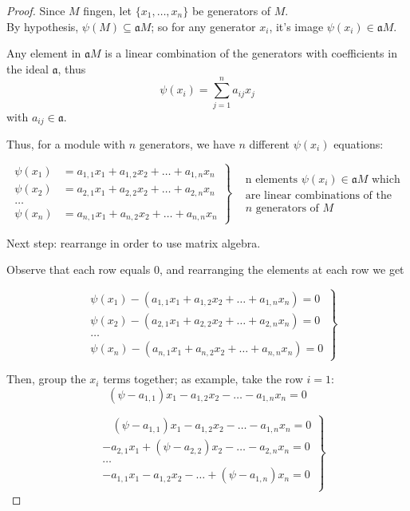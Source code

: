 \documentclass{article}
\theoremstyle{definition}
\newcommand{\aA}{\mathfrak{a}} %
\begin{document}
\begin{proof}
  Since $M$ fingen, let $\{ x_1, \ldots, x_n \}$ be generators of $M$.\\
  By hypothesis, $\psi(M) \subseteq \aA M$; so for any generator $x_i$, it's image $\psi(x_i) \in \aA M$.

  Any element in $\aA M$ is a linear combination of the generators with coefficients in the ideal $\aA$, thus
  $$\psi(x_i)= \sum_{j=1}^n a_{ij} x_j$$
  with $a_{ij} \in \aA$.
  
  Thus, for a module with $n$ generators, we have $n$ different $\psi(x_i)$ equations:

  $$
  \left.
  \begin{aligned}
    \psi(x_1) &= a_{1,1} x_1 + a_{1,2} x_2 + \ldots + a_{1,n} x_n\\
    \psi(x_2) &= a_{2,1} x_1 + a_{2,2} x_2 + \ldots + a_{2,n} x_n\\
    \ldots\\
    \psi(x_n) &= a_{n,1} x_1 + a_{n,2} x_2 + \ldots + a_{n,n} x_n
  \end{aligned}
  \right\}
  \begin{aligned}
      &\text{n elements $\psi(x_i) \in \aA M$ which}\\
      &\text{are linear combinations of the}\\
      &\text{$n$ generators of $M$}
  \end{aligned}
  $$
  
  Next step: rearrange in order to use matrix algebra.

  Observe that each row equals $0$, and rearranging the elements at each row we get

  $$
  \left.
  \begin{aligned}
    &\psi(x_1) - (a_{1,1} x_1 + a_{1,2} x_2 + \ldots + a_{1,n} x_n) = 0\\
    &\psi(x_2) - (a_{2,1} x_1 + a_{2,2} x_2 + \ldots + a_{2,n} x_n) = 0\\
    &\ldots\\
    &\psi(x_n) - (a_{n,1} x_1 + a_{n,2} x_2 + \ldots + a_{n,n} x_n) = 0
  \end{aligned}
  \right\}
  $$

  Then, group the $x_i$ terms together; as example, take the row $i=1$:
    $$(\psi - a_{1,1})x_1 - a_{1,2} x_2 - \ldots - a_{1,n} x_n = 0$$

  $$
  \left.
  \begin{aligned}
    &~~~~(\psi - a_{1,1})x_1 - a_{1,2} x_2 - \ldots - a_{1,n} x_n = 0\\
    &-a_{2,1} x_1 + (\psi - a_{2,2}) x_2 - \ldots - a_{2,n} x_n = 0\\
    &\ldots\\
    &-a_{1,1} x_1 - a_{1,2} x_2 - \ldots + (\psi - a_{1,n}) x_n = 0\\
  \end{aligned}
  \right\}
  $$
    

\end{proof}
\end{document}
